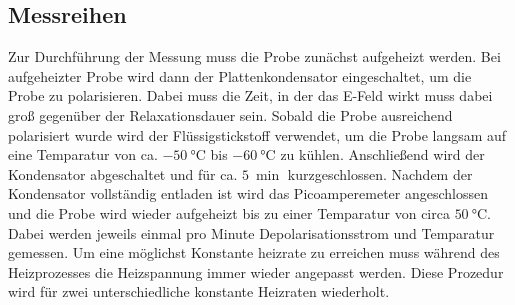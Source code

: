 \subsection{Messreihen}
Zur Durchführung der Messung muss die Probe zunächst aufgeheizt werden. Bei aufgeheizter Probe wird dann der Plattenkondensator eingeschaltet, um die Probe zu polarisieren. Dabei muss die Zeit, in der das E-Feld wirkt muss dabei groß gegenüber der Relaxationsdauer sein. Sobald die Probe ausreichend polarisiert wurde wird der Flüssigstickstoff verwendet, um die Probe langsam auf eine Temparatur von ca. $\SI{-50}{\celsius}$ bis $\SI{-60}{\celsius}$ zu kühlen. Anschließend wird der Kondensator abgeschaltet und für ca. $\SI{5}{\min}$ kurzgeschlossen. Nachdem der Kondensator vollständig entladen ist wird das Picoamperemeter angeschlossen und die Probe wird wieder aufgeheizt bis zu einer Temparatur von circa $\SI{50}{\celsius}$. Dabei werden jeweils einmal pro Minute Depolarisationsstrom und Temparatur gemessen. Um eine möglichst Konstante heizrate zu erreichen muss während des Heizprozesses die Heizspannung immer wieder angepasst werden. Diese Prozedur wird für zwei unterschiedliche konstante Heizraten wiederholt.